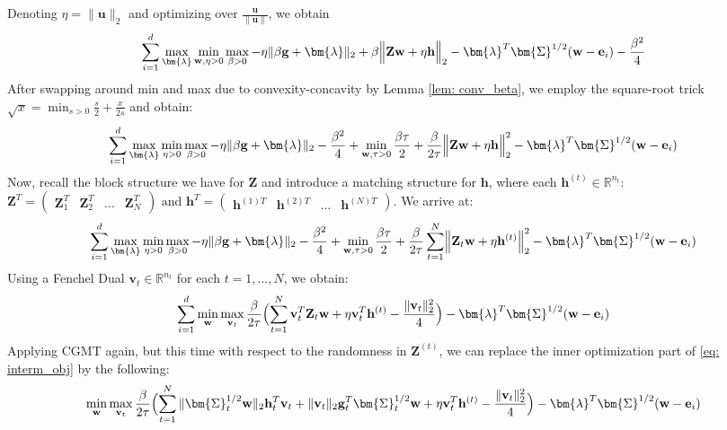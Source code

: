 \documentclass[final]{l4dc2026}
\newcommand{\bSigma}{\bm{\Sigma}}
\newcommand{\blambda}{\bm{\lambda}}
\newcommand{\bZ}{\mathbf{Z}}
\newcommand{\be}{\mathbf{e}}
\newcommand{\bg}{\mathbf{g}}
\newcommand{\bh}{\mathbf{h}}
\newcommand{\bu}{\mathbf{u}}
\newcommand{\bv}{\mathbf{v}}
\newcommand{\bw}{\mathbf{w}}
\newcommand{\bbR}{\mathbb{R}}
\begin{document}
 Denoting $\eta = \|\bu\|_2$ and optimizing over $\frac{\bu}{\|\bu\|}$, we obtain
\begin{align*}
     \sum_{i=1}^d  \max_{\blambda} \min_{\bw, \eta > 0} \max_{\beta>0}  -\eta  \|\beta \bg + \blambda\|_2+ \beta \Bigl\|\bZ \bw +   \eta \bh \Bigr\|_2 - \blambda ^T \bSigma^{1/2} (\bw - \be_i)  - \frac{\beta^2}{4}
\end{align*}
After swapping around min and max due to convexity-concavity by Lemma \ref{lem: conv_beta}, we employ the square-root trick $\sqrt{x} = \min_{s>0} \frac{s}{2} + \frac{x}{2s}$ and obtain:
\begin{align*}
    \sum_{i=1}^d  \max_{\blambda} \min_{\eta > 0} \max_{\beta>0}  -\eta  \|\beta \bg + \blambda\|_2 - \frac{\beta^2}{4} + \min_{\bw, \tau>0} \frac{\beta \tau}{2} + \frac{\beta}{2\tau} \Bigl\|\bZ \bw +   \eta \bh \Bigr\|^2_2  - \blambda ^T \bSigma^{1/2} (\bw - \be_i)
\end{align*}
Now, recall the block structure we have for $\bZ$ and introduce a matching structure for $\bh$, where each $\bh^{(t)} \in \bbR^{n_t}$:
    $\bZ^T =  \begin{pmatrix}
        \bZ_1^T &
        \bZ_2^T &
        \hdots &
        \bZ_N^T
    \end{pmatrix} \text{ and } \bh^T =  \begin{pmatrix}
        \bh^{(1) T} &
        \bh^{(2) T}&
        \hdots &
        \bh^{(N) T}\end{pmatrix}$. 
We arrive at:
\begin{align*}
    \sum_{i=1}^d \max_{\blambda} \min_{\eta > 0} \max_{\beta>0}  -\eta  \|\beta \bg + \blambda\|_2 - \frac{\beta^2}{4} + \min_{\bw, \tau>0} \frac{\beta \tau}{2} + \frac{\beta}{2\tau}\sum_{t=1}^N \Bigl\|\bZ_t \bw +   \eta \bh^{(t)} \Bigr\|^2_2  - \blambda ^T \bSigma^{1/2} (\bw - \be_i)
\end{align*}
Using a Fenchel Dual $\bv_t \in \bbR^{n_t}$ for each $t=1,\dots,N$, we obtain:
\begin{align}\label{eq: interm_obj}
    \sum_{i=1}^d  \min_{\bw} \max_{\bv_t}\frac{\beta}{2\tau} \Bigl( \sum_{t=1}^N \bv_t^T \bZ_t \bw +   \eta \bv_t^T\bh^{(t)} - \frac{\|\bv_t\|_2^2}{4} \Bigr)  - \blambda ^T \bSigma^{1/2} (\bw - \be_i)
\end{align}
Applying CGMT again, but this time with respect to the randomness in $\bZ^{(t)}$, we can replace the inner optimization part of \eqref{eq: interm_obj} by the following:
\begin{align}\label{eq: master_ao}
    \min_{\bw} \max_{\bv_t}  \frac{\beta}{2\tau} \Bigl( \sum_{t=1}^N \|\bSigma_t^{1/2}\bw\|_2 \bh_t^T \bv_t + \|\bv_t\|_2 \bg_t^T \bSigma_t^{1/2}\bw +   \eta \bv_t^T\bh^{(t)}   - \frac{\|\bv_t\|_2^2}{4}\Bigr)  - \blambda ^T \bSigma^{1/2} (\bw - \be_i)
\end{align}
\end{document}
